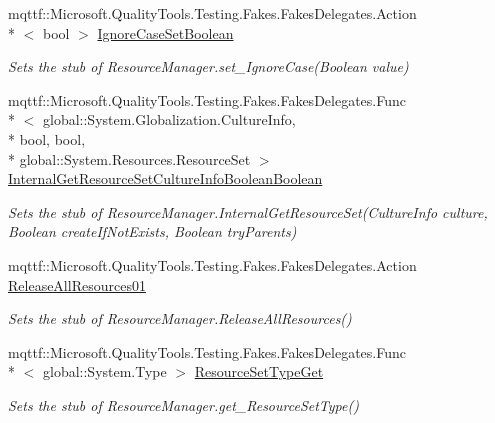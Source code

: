 \begin{DoxyCompactItemize}
mqttf\-::\-Microsoft.\-Quality\-Tools.\-Testing.\-Fakes.\-Fakes\-Delegates.\-Action\\*
$<$ bool $>$ \hyperlink{class_system_1_1_resources_1_1_fakes_1_1_stub_resource_manager_a1ca726094e68db9a5b9be5f9da604286}{Ignore\-Case\-Set\-Boolean}
\begin{DoxyCompactList}\small\item\em Sets the stub of Resource\-Manager.\-set\-\_\-\-Ignore\-Case(\-Boolean value)\end{DoxyCompactList}\item 
mqttf\-::\-Microsoft.\-Quality\-Tools.\-Testing.\-Fakes.\-Fakes\-Delegates.\-Func\\*
$<$ global\-::\-System.\-Globalization.\-Culture\-Info, \\*
bool, bool, \\*
global\-::\-System.\-Resources.\-Resource\-Set $>$ \hyperlink{class_system_1_1_resources_1_1_fakes_1_1_stub_resource_manager_aba1161d37868b5d33d0a35271047592c}{Internal\-Get\-Resource\-Set\-Culture\-Info\-Boolean\-Boolean}
\begin{DoxyCompactList}\small\item\em Sets the stub of Resource\-Manager.\-Internal\-Get\-Resource\-Set(\-Culture\-Info culture, Boolean create\-If\-Not\-Exists, Boolean try\-Parents)\end{DoxyCompactList}\item 
mqttf\-::\-Microsoft.\-Quality\-Tools.\-Testing.\-Fakes.\-Fakes\-Delegates.\-Action \hyperlink{class_system_1_1_resources_1_1_fakes_1_1_stub_resource_manager_a20ca0647cc564db40e054b674311b927}{Release\-All\-Resources01}
\begin{DoxyCompactList}\small\item\em Sets the stub of Resource\-Manager.\-Release\-All\-Resources()\end{DoxyCompactList}\item 
mqttf\-::\-Microsoft.\-Quality\-Tools.\-Testing.\-Fakes.\-Fakes\-Delegates.\-Func\\*
$<$ global\-::\-System.\-Type $>$ \hyperlink{class_system_1_1_resources_1_1_fakes_1_1_stub_resource_manager_a69b2fec4e7ba8835e67af15dbbfedb1e}{Resource\-Set\-Type\-Get}
\begin{DoxyCompactList}\small\item\em Sets the stub of Resource\-Manager.\-get\-\_\-\-Resource\-Set\-Type()\end{DoxyCompactList}\end{DoxyCompactItemize}
